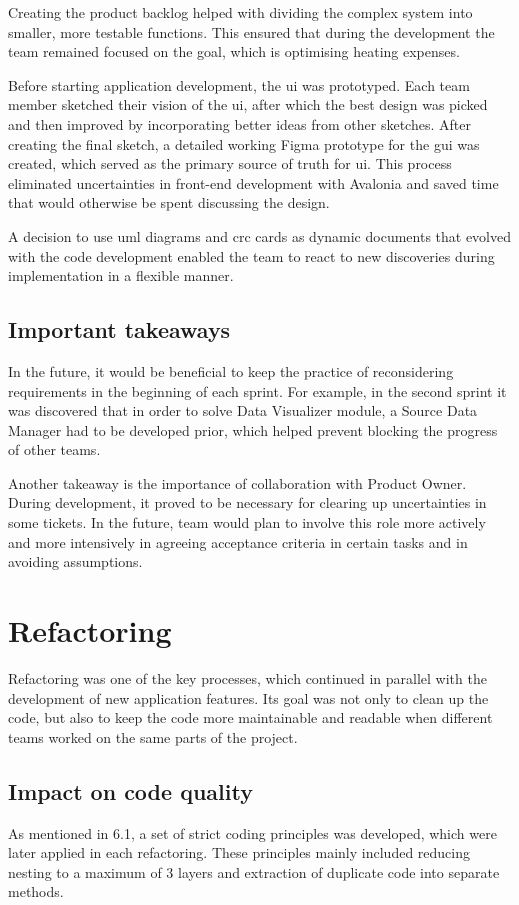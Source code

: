 Creating the product backlog helped with dividing the complex system into smaller, more testable functions. This ensured that during the development the team remained focused on the goal, which is optimising heating expenses.

Before starting application development, the \acrshort{ui} was prototyped. Each team member sketched their vision of the \acrshort{ui}, after which the best design was picked and then improved by incorporating better ideas from other sketches. After creating the final sketch, a detailed working Figma prototype for the \acrshort{gui} was created, which served as the primary source of truth for \acrshort{ui}. This process eliminated uncertainties in front-end development with Avalonia and saved time that would otherwise be spent discussing the design.

A decision to use \acrshort{uml} diagrams and \acrshort{crc} cards as dynamic documents that evolved with the code development enabled the team to react to new discoveries during implementation in a flexible manner.

\subsection{Important takeaways}
In the future, it would be beneficial to keep the practice of reconsidering requirements in the beginning of each sprint. For example, in the second sprint it was discovered that in order to solve Data Visualizer module, a Source Data Manager had to be developed prior, which helped prevent blocking the progress of other teams.

Another takeaway is the importance of collaboration with Product Owner. During development, it proved to be necessary for clearing up uncertainties in some tickets. In the future, team would plan to involve this role more actively and more intensively in agreeing acceptance criteria in certain tasks and in avoiding assumptions.

\section{Refactoring}
Refactoring was one of the key processes, which continued in parallel with the development of new application features. Its goal was not only to clean up the code, but also to keep the code more maintainable and readable when different teams worked on the same parts of the project.

\subsection{Impact on code quality}
As mentioned in 6.1, a set of strict coding principles was developed, which were later applied in each refactoring. These principles mainly included reducing nesting to a maximum of 3 layers and extraction of duplicate code into separate methods.

